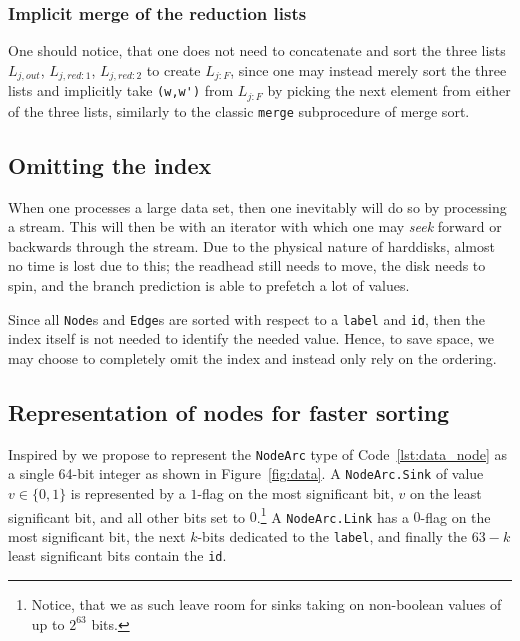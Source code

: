 
\subsubsection{Implicit merge of the reduction lists}
One should notice, that one does not need to concatenate and sort the three
lists $L_{j,\mathit{out}}$, $L_{j,\mathit{red:}1}$, $L_{j,\mathit{red:}2}$ to
create $L_{j:F}$, since one may instead merely sort the three lists and
implicitly take \lstinline{(w,w')} from $L_{j:F}$ by picking the next element
from either of the three lists, similarly to the classic \lstinline{merge}
subprocedure of merge sort.

\subsection{Omitting the index} \label{sec:optimisations__no_index}
When one processes a large data set, then one inevitably will do so by
processing a stream. This will then be with an iterator with which one may
\emph{seek} forward or backwards through the stream. Due to the physical nature
of harddisks, almost no time is lost due to this; the readhead still needs to
move, the disk needs to spin, and the branch prediction is able to prefetch a
lot of values.

Since all \lstinline{Node}s and \lstinline{Edge}s are sorted with respect to a
\lstinline{label} and \lstinline{id}, then the index itself is not needed to
identify the needed value. Hence, to save space, we may choose to completely
omit the index and instead only rely on the ordering.

\subsection{Representation of nodes for faster sorting}
Inspired by \cite{Dijk16} we propose to represent the \lstinline{NodeArc} type
of Code~\ref{lst:data_node} as a single 64-bit integer as shown in
Figure~\ref{fig:data}. A \lstinline{NodeArc.Sink} of value $v \in \{0,1\}$ is
represented by a $1$-flag on the most significant bit, $v$ on the least
significant bit, and all other bits set to $0$.\footnote{Notice, that we as such
  leave room for sinks taking on non-boolean values of up to $2^{63}$ bits.} A
\lstinline{NodeArc.Link} has a $0$-flag on the most significant bit, the next
$k$-bits dedicated to the \lstinline{label}, and finally the $63-k$ least
significant bits contain the \lstinline{id}.

